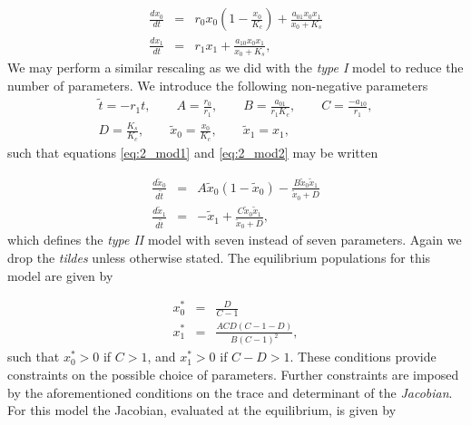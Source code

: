 \begin{eqnarray}
\frac{dx_{0}}{dt} &=& r_0x_0\left(1-\frac{x_0}{K_c}\right) + \frac{a_{01}x_0x_1}{x_0 + K_s} \label{eq:2_mod1} \\[10pt]
\frac{dx_{1}}{dt} &=& r_1x_1 + \frac{a_{10}x_0x_1}{x_0 + K_s} \label{eq:2_mod2}, 
\end{eqnarray}
%
We may perform a similar rescaling as we did with the \emph{type I} model to reduce the number of parameters. We introduce the following non-negative parameters
\begin{eqnarray}
\tilde{t} = -r_1 t, \qquad A = \frac{r_0}{r_1},  \qquad B = \frac{a_{01}}{r_1K_c}, \qquad C = \frac{-a_{10}}{r_1}, \\[10pt]
D = \frac{K_s}{K_c}, \qquad  \tilde{x}_0 = \frac{x_0}{K_c}, \qquad \tilde{x}_1 = x_1,
\end{eqnarray}
%
such that equations \eqref{eq:2_mod1} and \eqref{eq:2_mod2} may be written

\begin{eqnarray}
\frac{d\tilde{x}_{0}}{d\tilde{t}} &=& A\tilde{x}_0(1-\tilde{x}_0) - \frac{B\tilde{x}_0\tilde{x}_1}{\tilde{x}_0 + D} \label{eq:hol_mod1} \\[10pt]
\frac{d\tilde{x}_{1}}{d\tilde{t}} &=& -\tilde{x}_1 + \frac{C\tilde{x}_0\tilde{x}_1}{\tilde{x}_0 + D} \label{eq:hol_mod2}, 
\end{eqnarray}
%
which defines the \emph{type II} model with seven instead of seven parameters. Again we drop the \emph{tildes} unless otherwise stated. The equilibrium populations for this model are given by

\begin{eqnarray}
x_{0}^{*} &=& \frac{D}{C-1} \label{eq:hol_mod_sp1} \\[10pt]
x_{1}^{*} &=& \frac{ACD(C-1-D)}{B(C-1)^2} \label{eq:hol_mod_sp2}, 
\end{eqnarray}
%
such that $x_0^* > 0 $ if $C > 1$, and $x_1^* > 0 $ if $C - D > 1$. These conditions provide constraints on the possible choice of parameters. Further constraints are imposed by the aforementioned conditions on the trace and determinant of the \emph{Jacobian}. For this model the Jacobian, evaluated at the equilibrium, is given by

